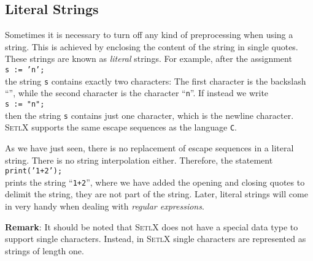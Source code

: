\subsection{Literal Strings}
Sometimes it is necessary to turn off any kind of preprocessing when using a string.  This
is achieved by enclosing the content of the string in single quotes.  These strings are
known as \emph{literal} strings.  For example, after
the assignment
\\[0.2cm]
\hspace*{1.3cm}
\texttt{s := 'n';}
\\[0.2cm]
the string \texttt{s} contains exactly two characters:  The first character is the
backslash ``\texttt{}'', while the second character is the character ``\texttt{n}''.
If  instead we write
\\[0.2cm]
\hspace*{1.3cm}
\texttt{s := "n";}
\\[0.2cm]
then the string \texttt{s} contains just one character, which is the newline character.
\textsc{SetlX} supports the same escape sequences as the language \texttt{C}.

As we have just seen, there is no replacement of escape sequences in a literal string.
There is no string interpolation either.  Therefore, the statement
\\[0.2cm]
\hspace*{1.3cm}
\texttt{print('1+2');}
\\[0.2cm]
prints the string ``\texttt{1+2}'', where we have added the opening
and closing quotes to delimit the string, they are not part of the string.
Later, literal strings will come in very handy when dealing with \emph{regular expressions}.
\vspace*{0.2cm}

\noindent
\textbf{Remark}:
It should be noted that \textsc{SetlX} does not have a special data type to support single characters.
Instead, in \textsc{SetlX} single characters are represented as strings of length one. 

